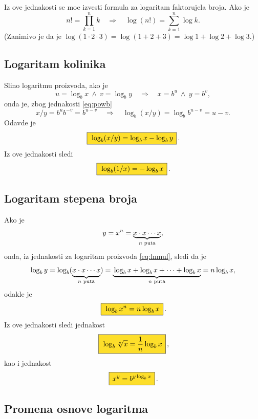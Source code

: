 \documentclass[12pt, twoside, a4paper]{article}
\def\land{\mathbin{\>\wedge\>}}
\def\logb{\log_b}
\def\okvir#1{\,\fcolorbox{black}{Goldenrod}{$\,\displaystyle{\mathstrut #1}\,$}\,}
\def\sledi{{\quad\Rightarrow\quad}}
\begin{document}
Iz ove jednakosti se mo{\zv}e izvesti formula za logaritam faktorujela broja. Ako je
$$
n!=\prod_{k=1}^n k\sledi \log(n!)=\sum_{k=1}^n\log k.
$$
(Zanim{\lj}ivo je da je $\log(1\cdot2\cdot3)=\log(1+2+3)=\log1+\log2+\log3$.)


\subsection{Logaritam koli{\cv}nika}

Sli{\cv}no logaritmu proizvoda, 
ako je
$$
u=\logb x\land v=\log_b y \sledi x=b^u\land y=b^v,
$$
onda je, zbog jednakosti \eqref{eq:powb}
$$
x/ y=b^ub^{-v}=b^{u-v}\sledi \logb(x/y)=\logb b^{u-v}=u-v.
$$
Odavde je
\begin{equation}
\okvir{\logb(x/ y)=\logb x-\logb y}.
\label{eq:lndiv}
\end{equation}
Iz ove jednakosti sledi
\begin{equation}
\okvir{\logb(1/x)=-\logb x}.
\label{eq:recip}
\end{equation}

\subsection{Logaritam stepena broja}

Ako je
$$
y=x^n=\underbrace{x\cdot x\cdots x}_{\text{$\mathstrut n$ puta}},
$$
onda, iz jednakosti za logaritam proizvoda \eqref{eq:lnmul}, sledi da je
$$
\logb y=\logb (\underbrace{\mathstrut x\cdot x\cdots x}_{\text{$n$ puta}})
=\underbrace{\mathstrut \logb x+\logb x+\cdots+\logb x}_{\text{$n$ puta}}
=n\logb x,
$$
odakle je
\begin{equation}
\okvir{\logb x^n=n\logb x}.
\label{eq:bpow}
\end{equation}
Iz ove jednakosti sledi jednakost
\begin{equation}
\okvir{\logb\sqrt[n] x=\frac1n\logb x},
\label{eq:lnroot}
\end{equation}
kao i jednakost
\begin{equation}
\okvir{x^y=b^{y\logb x}}.
\label{eq:power}
\end{equation}


\subsection{Promena osnove logaritma}
\end{document}
